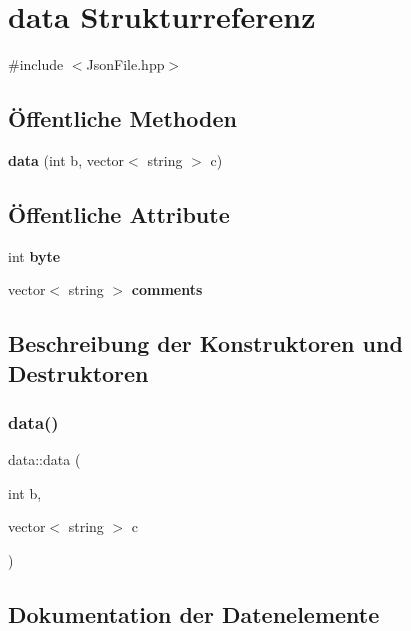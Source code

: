 \section{data Strukturreferenz}
\label{structdata}


{\ttfamily \#include $<$Json\+File.\+hpp$>$}

\subsection*{Öffentliche Methoden}
\begin{DoxyCompactItemize}
\item 
\textbf{ data} (int b, vector$<$ string $>$ c)
\end{DoxyCompactItemize}
\subsection*{Öffentliche Attribute}
\begin{DoxyCompactItemize}
\item 
int \textbf{ byte}
\item 
vector$<$ string $>$ \textbf{ comments}
\end{DoxyCompactItemize}


\subsection{Beschreibung der Konstruktoren und Destruktoren}
\mbox{\label{structdata_a36e2d011a3d647b9591f496424177f58}} 
\subsubsection{data()}
{\footnotesize\ttfamily data\+::data (\begin{DoxyParamCaption}\item[{int}]{b,  }\item[{vector$<$ string $>$}]{c }\end{DoxyParamCaption})\hspace{0.3cm}{\ttfamily [inline]}}



\subsection{Dokumentation der Datenelemente}
\mbox{\label{structdata_ae2cf6885aa26926dc84d4d3d4ad42178}} 
